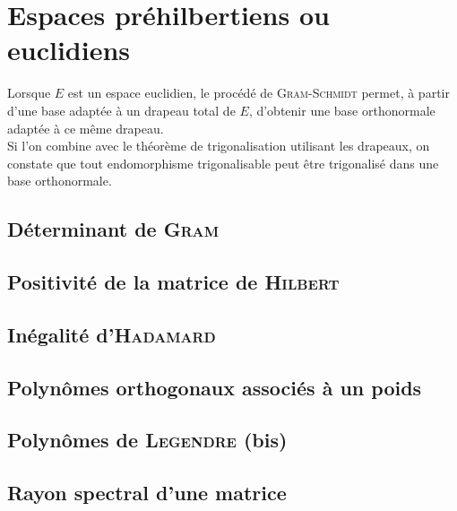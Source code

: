 \chapter{Espaces préhilbertiens ou euclidiens}

Lorsque $E$ est un espace euclidien, le procédé de \textsc{Gram}-\textsc{Schmidt} permet, à partir d'une base adaptée à un drapeau total de $E$, d'obtenir une base orthonormale adaptée à ce même drapeau. \\
Si l'on combine avec le théorème de trigonalisation utilisant les drapeaux, on constate que tout endomorphisme trigonalisable peut être trigonalisé dans une base orthonormale. 

\section{Déterminant de \textsc{Gram}} \label{matrice_gram}


\section{Positivité de la matrice de \textsc{Hilbert}}


\section{Inégalité d'\textsc{Hadamard}}


\section{Polynômes orthogonaux associés à un poids}


\section{Polynômes de \textsc{Legendre} (bis)}


\section{Rayon spectral d'une matrice} \label{rayon_spectral}


